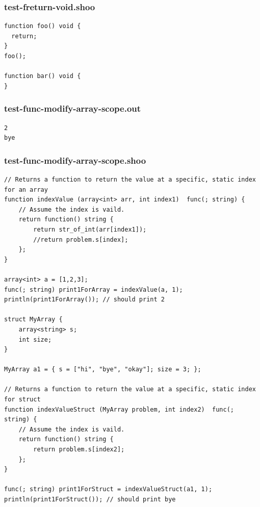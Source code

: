 \documentclass[12pt]{article}
\begin{document}
\subsubsection{test-freturn-void.shoo}
\begin{mdframed}[hidealllines=true,backgroundcolor=blue!10]
\begin{lstlisting}
function foo() void {
  return;
}
foo();

function bar() void {
}
\end{lstlisting}
\end{mdframed}
\subsubsection{test-func-modify-array-scope.out}
\begin{mdframed}[hidealllines=true,backgroundcolor=green!10]
\begin{lstlisting}
2
bye
\end{lstlisting}
\end{mdframed}
\subsubsection{test-func-modify-array-scope.shoo}
\begin{mdframed}[hidealllines=true,backgroundcolor=blue!10]
\begin{lstlisting}
// Returns a function to return the value at a specific, static index for an array
function indexValue (array<int> arr, int index1)  func(; string) {
    // Assume the index is vaild.
    return function() string {
        return str_of_int(arr[index1]);
        //return problem.s[index];
    };
}

array<int> a = [1,2,3];
func(; string) print1ForArray = indexValue(a, 1);
println(print1ForArray()); // should print 2

struct MyArray {
    array<string> s;
    int size;
}

MyArray a1 = { s = ["hi", "bye", "okay"]; size = 3; };

// Returns a function to return the value at a specific, static index for struct
function indexValueStruct (MyArray problem, int index2)  func(; string) {
    // Assume the index is vaild.
    return function() string {
        return problem.s[index2]; 
    };
}

func(; string) print1ForStruct = indexValueStruct(a1, 1);
println(print1ForStruct()); // should print bye
\end{lstlisting}
\end{mdframed}
\end{document}
